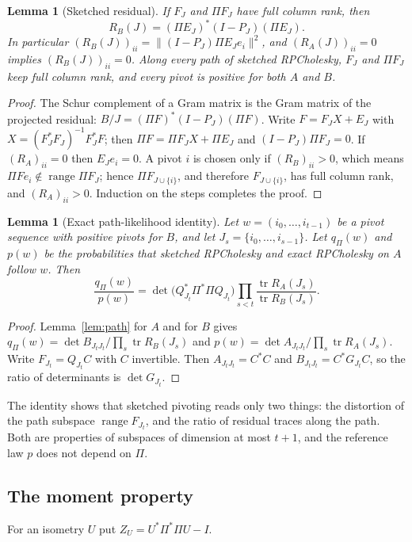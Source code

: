 \documentclass[11pt]{article}
\newtheorem{lemma}[theorem]{Lemma}
\theoremstyle{definition}\newtheorem{definition}[theorem]{Definition}
\theoremstyle{remark}\newtheorem{remark}[theorem]{Remark}
\newcommand{\tr}{\operatorname{tr}}
\newcommand{\1}{\mathbf 1}
\begin{document}
\begin{lemma}[Sketched residual]\label{lem:sk-residual}
If $F_J$ and $\Pi F_J$ have full column rank, then
\[
 R_B(J)=(\Pi E_J)^*(I-P_J)(\Pi E_J).
\]
In particular $(R_B(J))_{ii}=\|(I-P_J)\Pi E_Je_i\|^2$, and
$(R_A(J))_{ii}=0$ implies $(R_B(J))_{ii}=0$. Along every path of
sketched RPCholesky, $F_J$ and $\Pi F_J$ keep full column rank, and
every pivot is positive for both $A$ and $B$.
\end{lemma}
\begin{proof}
The Schur complement of a Gram matrix is the Gram matrix of the
projected residual: $B/J=(\Pi F)^*(I-P_J)(\Pi F)$. Write
$F=F_JX+E_J$ with $X=(F_J^*F_J)^{-1}F_J^*F$; then
$\Pi F=\Pi F_JX+\Pi E_J$ and $(I-P_J)\Pi F_J=0$. If $(R_A)_{ii}=0$ then
$E_Je_i=0$. A pivot $i$ is chosen only if $(R_B)_{ii}>0$, which means
$\Pi Fe_i\notin\operatorname{range}\Pi F_J$; hence $\Pi F_{J\cup\{i\}}$,
and therefore $F_{J\cup\{i\}}$, has full column rank, and
$(R_A)_{ii}>0$. Induction on the steps completes the proof.
\end{proof}

\begin{lemma}[Exact path-likelihood identity]\label{lem:likelihood}
Let $w=(i_0,\dots,i_{t-1})$ be a pivot sequence with positive pivots
for $B$, and let $J_s=\{i_0,\dots,i_{s-1}\}$. Let $q_\Pi(w)$ and $p(w)$
be the probabilities that sketched RPCholesky and exact RPCholesky on
$A$ follow $w$. Then
\[
 \frac{q_\Pi(w)}{p(w)}
 =\det\bigl(Q_{J_t}^*\Pi^*\Pi Q_{J_t}\bigr)
  \prod_{s<t}\frac{\tr R_A(J_s)}{\tr R_B(J_s)} .
\]
\end{lemma}
\begin{proof}
Lemma~\ref{lem:path} for $A$ and for $B$ gives
$q_\Pi(w)=\det B_{J_tJ_t}/\prod_s\tr R_B(J_s)$ and
$p(w)=\det A_{J_tJ_t}/\prod_s\tr R_A(J_s)$. Write $F_{J_t}=Q_{J_t}C$
with $C$ invertible. Then $A_{J_tJ_t}=C^*C$ and
$B_{J_tJ_t}=C^*G_{J_t}C$, so the ratio of determinants is
$\det G_{J_t}$.
\end{proof}

The identity shows that sketched pivoting reads only two things: the
distortion of the path subspace $\operatorname{range}F_{J_t}$, and the
ratio of residual traces along the path. Both are properties of
subspaces of dimension at most $t+1$, and the reference law $p$ does not
depend on $\Pi$.

\subsection{The moment property}
For an isometry $U$ put $Z_U=U^*\Pi^*\Pi U-I$.
\end{document}
